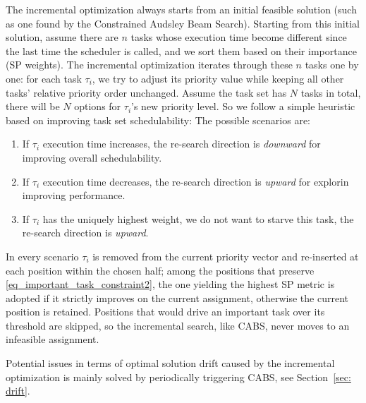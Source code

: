     The incremental optimization always starts from an initial feasible solution (such as one found by the Constrained Audsley Beam Search).
    Starting from this initial solution, assume there are $n$ tasks whose execution time become different since the last time the scheduler is called, and we sort them based on their importance (SP weights). 
    The incremental optimization iterates through these $n$ tasks one by one: for each task $\tau_i$, we try to adjust its priority value while keeping all other tasks' relative priority order unchanged. 
    Assume the task set has $N$ tasks in total, there will be $N$ options for $\tau_i$'s new priority level. So we follow a simple heuristic based on improving task set schedulability:
The possible scenarios are:
\begin{enumerate}
    \item If $\tau_i$ execution time increases, the re-search direction is \emph{downward} for improving overall schedulability.
    \item If $\tau_i$ execution time decreases, the re-search direction is \emph{upward} for explorin improving performance.
    \item If $\tau_i$ has the uniquely highest weight, we do not want to starve this task, the re-search direction is \emph{upward}.
\end{enumerate}
In every scenario $\tau_i$ is removed from the current priority vector and re-inserted at each position within the chosen half; 
among the positions that preserve \eqref{eq_important_task_constraint2}, the one yielding the highest SP metric is adopted if it strictly improves on the current assignment, 
otherwise the current position is retained.
Positions that would drive an important task over its threshold are skipped, so the incremental search, like CABS, never moves to an infeasible assignment.

Potential issues in terms of optimal solution drift caused by the incremental optimization is mainly solved by periodically triggering CABS, see Section~\ref{sec: drift}.


